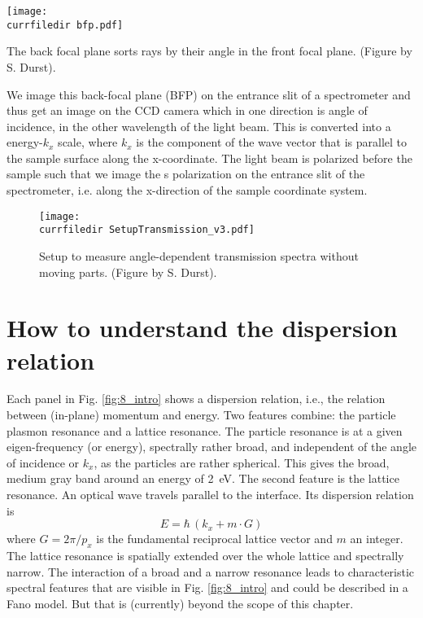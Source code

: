 \begin{marginfigure}
\texttt{[image: \\currfiledir bfp.pdf]}
\caption{The back focal plane sorts rays by their angle in the front focal plane.  (Figure by S. Durst).}
\end{marginfigure}

We image this back-focal plane (BFP) on the entrance slit of a spectrometer and thus get an image on the CCD camera which in one direction is angle of incidence, in the other wavelength of the light beam. This is converted into a energy-$k_x$ scale, where $k_x$ is the component of the wave vector that is parallel to the sample surface along the x-coordinate. The light beam is polarized before the sample such that we image the s polarization on the entrance slit of the spectrometer, i.e. along the x-direction of the sample coordinate system.


\begin{figure}
\texttt{[image: \\currfiledir SetupTransmission\_v3.pdf]}
\caption{Setup to measure angle-dependent transmission spectra without moving parts.  (Figure by S. Durst). }
\end{figure}


\section{How to understand the dispersion relation}

Each panel in Fig. \ref{fig:8_intro} shows a dispersion relation, i.e., the relation between (in-plane) momentum and energy. Two features combine: the particle plasmon resonance and a lattice resonance. The particle resonance is at a given eigen-frequency (or energy), spectrally rather broad, and independent of the angle of incidence or $k_x$, as the particles are rather spherical. This gives the broad, medium gray band around an energy of 2~eV. The second feature is the lattice resonance.  An optical wave travels parallel to the interface. Its dispersion relation is
\begin{equation}
 E =   \hbar  \, \left(  k_x + m \cdot G \right)
\end{equation}
where $G = 2 \pi / p_x$ is the fundamental reciprocal lattice vector and $m$ an integer. The lattice resonance is spatially extended over the whole lattice and spectrally narrow. The interaction of a broad and a narrow resonance leads to characteristic spectral features that are visible in Fig. \ref{fig:8_intro}  and could be described in a Fano model. But that is (currently) beyond the scope of this chapter.

